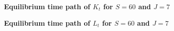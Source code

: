 \documentclass[letterpaper,12pt]{article}
\theoremstyle{definition}
\begin{document}
\begin{spacing}{1.5}
    \begin{figure}[htb]\centering \captionsetup{width=4.0in}
      \caption{\label{FigKpathTPI}\textbf{Equilibrium time path of $K_t$ for $S=60$ and $J=7$}}
    \end{figure}

    \begin{figure}[htb]\centering \captionsetup{width=4.0in}
      \caption{\label{FigLpathTPI}\textbf{Equilibrium time path of $L_t$ for $S=60$ and $J=7$}}
    \end{figure}


\end{spacing}
\end{document}
